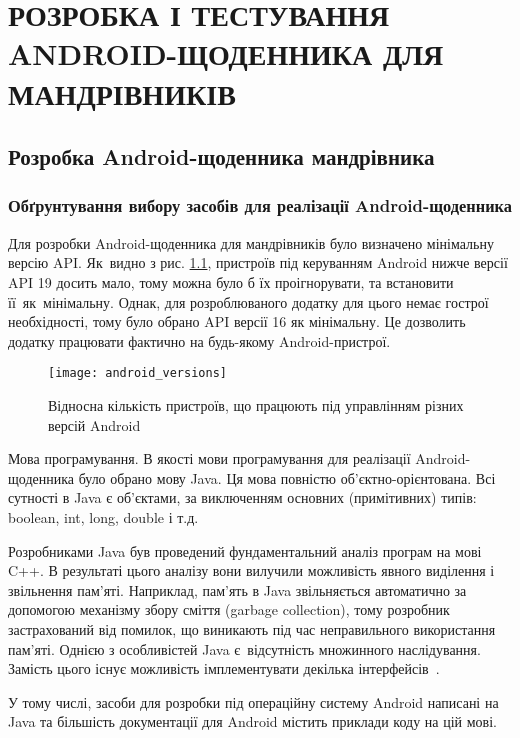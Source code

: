 \documentclass[../main.tex]{subfiles}
\begin{document}
	
\chapter{РОЗРОБКА І ТЕСТУВАННЯ ANDROID-ЩОДЕННИКА ДЛЯ МАНДРІВНИКІВ}
	
\section{Розробка Android-щоденника мандрівника}
	
\subsection{Обґрунтування вибору засобів для реалізації Android-щоденника}
Для розробки Android-щоденника для мандрівників було визначено мінімальну версію API. Як~видно з рис. \ref{chart:android_versions}, пристроїв під керуванням Android нижче версії API 19 досить мало, тому можна було б їх проігнорувати, та встановити її~як~мінімальну. Однак, для розроблюваного додатку для цього немає гострої необхідності, тому було обрано API версії 16 як мінімальну. Це дозволить додатку працювати фактично на будь-якому Android-пристрої.

\begin{figure}[H]
	\centering
	\texttt{[image: android\_versions]}
	\caption{Відносна кількість пристроїв, що працюють під управлінням різних версій Android}
	\label{chart:android_versions}
\end{figure}

Мова програмування.
В якості мови програмування для реалізації Android-щоденника було обрано мову Java. Ця мова повністю \mbox{об'єктно-орієнтована}. Всі сутності в Java є об'єктами, за виключенням основних (примітивних) типів: boolean, int, long, double і т.д. 

Розробниками Java був проведений фундаментальний аналіз програм на мові C++. В результаті цього аналізу вони вилучили можливість явного виділення і звільнення пам'яті. Наприклад, пам'ять в Java звільняється автоматично за допомогою механізму збору сміття (garbage collection), тому розробник застрахований від помилок, що виникають під час неправильного використання пам'яті. Однією з особливістей Java є~відсутність множинного наслідування. Замість цього існує можливість імплементувати декілька інтерфейсів~\cite{thinking_java}.

У тому числі, засоби для розробки під операційну систему Android написані на Java та більшість документації для Android містить приклади коду на цій мові.
\end{document}
